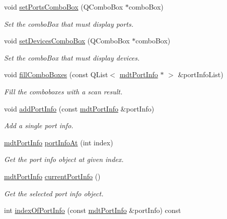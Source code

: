 \begin{DoxyCompactItemize}
\item 
void \hyperlink{classmdt_port_info_cb_handler_a06f9b5e8127e61026911691827f3203a}{setPortsComboBox} (QComboBox $\ast$comboBox)
\begin{DoxyCompactList}\small\item\em Set the comboBox that must display ports. \end{DoxyCompactList}\item 
void \hyperlink{classmdt_port_info_cb_handler_a59fc2180a69119e17cfa24cf84a9c96f}{setDevicesComboBox} (QComboBox $\ast$comboBox)
\begin{DoxyCompactList}\small\item\em Set the comboBox that must display devices. \end{DoxyCompactList}\item 
void \hyperlink{classmdt_port_info_cb_handler_a82c84a3eb52cd5d941377a64788a28ef}{fillComboBoxes} (const QList$<$ \hyperlink{classmdt_port_info}{mdtPortInfo} $\ast$ $>$ \&portInfoList)
\begin{DoxyCompactList}\small\item\em Fill the comboboxes with a scan result. \end{DoxyCompactList}\item 
void \hyperlink{classmdt_port_info_cb_handler_ae84e252c9783c204583639212a04aa12}{addPortInfo} (const \hyperlink{classmdt_port_info}{mdtPortInfo} \&portInfo)
\begin{DoxyCompactList}\small\item\em Add a single port info. \end{DoxyCompactList}\item 
\hyperlink{classmdt_port_info}{mdtPortInfo} \hyperlink{classmdt_port_info_cb_handler_a92a284d227c4f0ce42df9890a9185a97}{portInfoAt} (int index)
\begin{DoxyCompactList}\small\item\em Get the port info object at given index. \end{DoxyCompactList}\item 
\hyperlink{classmdt_port_info}{mdtPortInfo} \hyperlink{classmdt_port_info_cb_handler_a5723df72c4f1eda572c04e377dde9351}{currentPortInfo} ()
\begin{DoxyCompactList}\small\item\em Get the selected port info object. \end{DoxyCompactList}\item 
int \hyperlink{classmdt_port_info_cb_handler_ace2f9273d3f508507e496bdb2dc6d5c6}{indexOfPortInfo} (const \hyperlink{classmdt_port_info}{mdtPortInfo} \&portInfo) const 

\end{DoxyCompactItemize}
